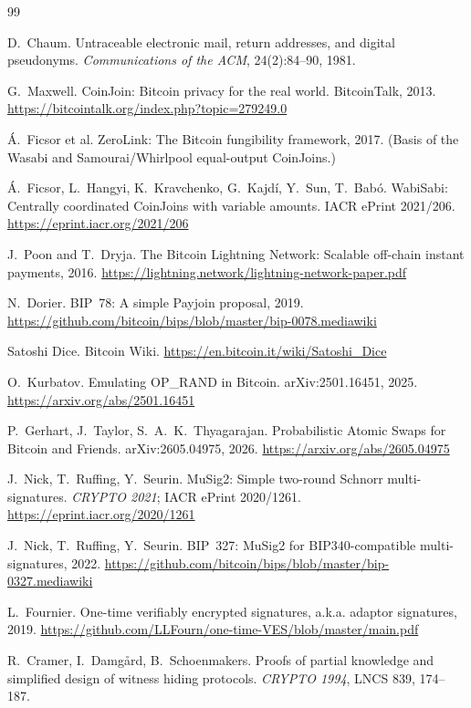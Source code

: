 \documentclass[11pt]{article}
\begin{document}
\begin{thebibliography}{99}

 D.~Chaum. Untraceable electronic mail, return addresses, and digital pseudonyms. \emph{Communications of the ACM}, 24(2):84--90, 1981.

 G.~Maxwell. CoinJoin: Bitcoin privacy for the real world. BitcoinTalk, 2013. \url{https://bitcointalk.org/index.php?topic=279249.0}

 \'A.~Ficsor et al. ZeroLink: The Bitcoin fungibility framework, 2017. (Basis of the Wasabi and Samourai/Whirlpool equal-output CoinJoins.)

 \'A.~Ficsor, L.~Hangyi, K.~Kravchenko, G.~Kajd\'i, Y.~Sun, T.~Bab\'o. WabiSabi: Centrally coordinated CoinJoins with variable amounts. IACR ePrint 2021/206. \url{https://eprint.iacr.org/2021/206}

 J.~Poon and T.~Dryja. The Bitcoin Lightning Network: Scalable off-chain instant payments, 2016. \url{https://lightning.network/lightning-network-paper.pdf}

 N.~Dorier. BIP~78: A simple Payjoin proposal, 2019. \url{https://github.com/bitcoin/bips/blob/master/bip-0078.mediawiki}

 Satoshi Dice. Bitcoin Wiki. \url{https://en.bitcoin.it/wiki/Satoshi_Dice}

 O.~Kurbatov. Emulating OP\_RAND in Bitcoin. arXiv:2501.16451, 2025. \url{https://arxiv.org/abs/2501.16451}

 P.~Gerhart, J.~Taylor, S.~A.~K.~Thyagarajan. Probabilistic Atomic Swaps for Bitcoin and Friends. arXiv:2605.04975, 2026. \url{https://arxiv.org/abs/2605.04975}

 J.~Nick, T.~Ruffing, Y.~Seurin. MuSig2: Simple two-round Schnorr multi-signatures. \emph{CRYPTO 2021}; IACR ePrint 2020/1261. \url{https://eprint.iacr.org/2020/1261}

 J.~Nick, T.~Ruffing, Y.~Seurin. BIP~327: MuSig2 for BIP340-compatible multi-signatures, 2022. \url{https://github.com/bitcoin/bips/blob/master/bip-0327.mediawiki}

 L.~Fournier. One-time verifiably encrypted signatures, a.k.a. adaptor signatures, 2019. \url{https://github.com/LLFourn/one-time-VES/blob/master/main.pdf}

 R.~Cramer, I.~Damg\aa rd, B.~Schoenmakers. Proofs of partial knowledge and simplified design of witness hiding protocols. \emph{CRYPTO 1994}, LNCS 839, 174--187.


\end{thebibliography}
\end{document}
